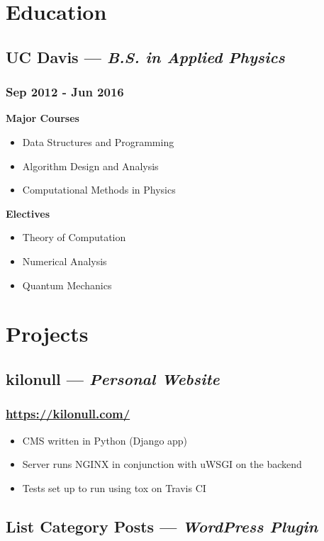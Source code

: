\documentclass{article}
\begin{document}
\begin{minipage}[t]{.8\textwidth}
\section*{Education}
\subsection*{UC Davis --- \textit{B.S. in Applied Physics}}
\subsubsection*{Sep 2012 - Jun 2016}
\parbox[t]{.5\textwidth}{\raggedright%
\textbf{Major Courses}
\begin{itemize}
\vspace{-0.6em}
	\item Data Structures and Programming
	\item Algorithm Design and Analysis
	\item Computational Methods in Physics
\end{itemize}}
\hspace{0.3cm}
\parbox[t]{.5\textwidth}{\raggedright%
\textbf{Electives}
\begin{itemize}[topsep=0cm]
	\item Theory of Computation
	\item Numerical Analysis
	\item Quantum Mechanics
\end{itemize}
}
\section*{Projects}
\subsection*{kilonull --- \textit{Personal Website}}
\subsubsection*{\href{https://kilonull.com/}{https://kilonull.com/}}
\begin{itemize}
	\item CMS written in Python (Django app)
	\item Server runs NGINX in conjunction with uWSGI on the backend
	\item Tests set up to run using tox on Travis CI
\end{itemize}
\subsection*{List Category Posts --- \textit{WordPress Plugin}}

\end{minipage}
\end{document}
